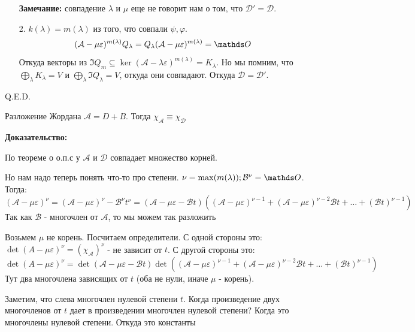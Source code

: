 \begin{enumerate}
    \textbf{Замечание:} совпадение  $\lambda$ и $\mu$ еще не говорит нам о том, что $\mathcal{D}' = \mathcal{D}$.
    \item[2.] $k(\lambda) = m(\lambda)$ из того, что совпали $\psi, \varphi$.
    $$(\mathcal{A}-\mu\varepsilon)^{m(\lambda)}Q_{\lambda} =Q_{\lambda}(\mathcal{A}-\mu\varepsilon)^{m(\lambda)} =\zero$$
    Откуда векторы из $\Im Q_{m} \subseteq \ker (\mathcal{A}-\lambda\varepsilon)^{m(\lambda)} = K_{\lambda}$. Но мы помним, что $\bigoplus\limits_{\lambda}K_{\lambda} = V$ и  $\bigoplus\limits_{\lambda}\Im Q_{\lambda} = V$, откуда они совпадают. Откуда $\mathcal{D} = \mathcal{D}'$.
\end{enumerate}


 \hfill Q.E.D.
















Разложение Жордана $\mathcal{A} = D + B$. Тогда
$\chi_{\mathcal{A}}\equiv \chi_\mathcal{D}$

\textbf{Доказательство:}

По теореме о о.п.с у $\mathcal{A}$ и $\mathcal{D}$ совпадает множество корней. 

Но нам надо теперь понять что-то про степени. $\nu = \max(m(\lambda)); \mathcal{B}^\nu = \zero$. Тогда:
$$(\mathcal{A}-\mu \varepsilon)^{\nu}=(\mathcal{A}-\mu \varepsilon)^{\nu} - \mathcal{B}^\nu t^\nu = (\mathcal{A-\mu \varepsilon-\mathcal{B}}t)((\mathcal{A}-\mu\varepsilon)^{\nu-1}+ (\mathcal{A}-\mu\varepsilon)^{\nu-2}\mathcal{B}t + \ldots + (\mathcal{B}t)^{\nu-1})$$
Так как $\mathcal{B}$ - многочлен от $\mathcal{A}$, то мы можем так разложить

Возьмем $\mu$ не корень. Посчитаем определители. С одной стороны это:
$\det (A-\mu \varepsilon)^\nu = (\chi_{\mathcal{A}})^\nu$  - не зависит от $t$.
С другой стороны это:
$$\det (A-\mu \varepsilon)^\nu = \det(\mathcal{A-\mu \varepsilon-\mathcal{B}}t)\det ((\mathcal{A}-\mu\varepsilon)^{\nu-1}+ (\mathcal{A}-\mu\varepsilon)^{\nu-2}\mathcal{B}t + \ldots + (\mathcal{B}t)^{\nu-1})$$
Тут два многочлена зависящих от $t$ (оба не нули, иначе $\mu$ - корень).

Заметим, что слева многочлен нулевой степени $t$. Когда произведение двух многочленов от $t$ дает в произведении многочлен нулевой степени? Когда это многочлены нулевой степени. Откуда это константы

